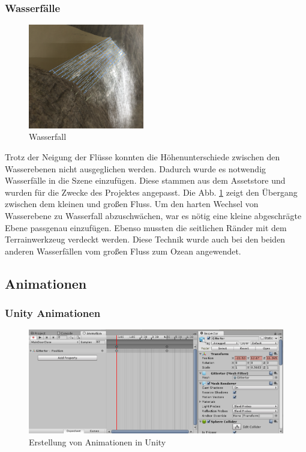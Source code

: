 \subsubsection{Wasserfälle}
\begin{figure}
	\begin{center}
		\includegraphics[width=0.45\textwidth]{Abbildungen/Unity/Waterfall}
	\end{center}
	\caption{Wasserfall}
	\label{fig:Waterfall}
\end{figure}

Trotz der Neigung der Flüsse konnten die Höhenunterschiede zwischen den Wasserebenen nicht ausgeglichen werden. Dadurch wurde es notwendig Wasserfälle in die Szene einzufügen. Diese stammen aus dem Assetstore und wurden für die Zwecke des Projektes angepasst. Die Abb. \ref{fig:Waterfall} zeigt den Übergang zwischen dem kleinen und großen Fluss. Um den harten Wechsel von Wasserebene zu Wasserfall abzuschwächen, war es nötig eine kleine abgeschrägte Ebene passgenau einzufügen. Ebenso mussten die seitlichen Ränder mit dem Terrainwerkzeug verdeckt werden. Diese Technik wurde auch bei den beiden anderen Wasserfällen vom großen Fluss zum Ozean angewendet.

\subsection{Animationen}
\subsubsection{Unity Animationen}
\begin{figure}[h]
	\centering
	\includegraphics[width=0.95\linewidth]{Abbildungen/Unity/UnityAnim2}
	\caption{Erstellung von Animationen in Unity}
	\label{fig:unityAnim}
\end{figure}

